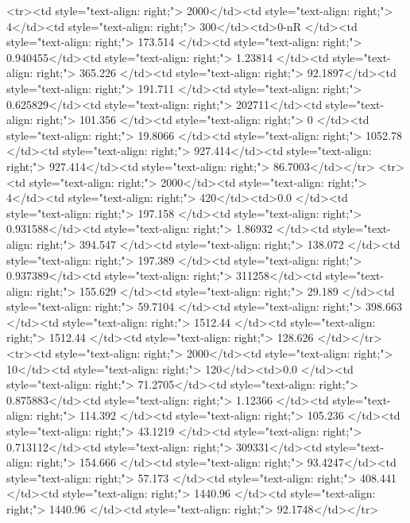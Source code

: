 <tr><td style="text-align: right;">      2000</td><td style="text-align: right;">         4</td><td style="text-align: right;">           300</td><td>0-nR         </td><td style="text-align: right;">               173.514 </td><td style="text-align: right;">           0.940455</td><td style="text-align: right;">         1.23814 </td><td style="text-align: right;">        365.226 </td><td style="text-align: right;">            92.1897</td><td style="text-align: right;">             191.711   </td><td style="text-align: right;">             0.625829</td><td style="text-align: right;">              202711</td><td style="text-align: right;">                      101.356 </td><td style="text-align: right;">             0     </td><td style="text-align: right;">                19.8066 </td><td style="text-align: right;">      1052.78  </td><td style="text-align: right;">    927.414</td><td style="text-align: right;">       927.414</td><td style="text-align: right;">                 86.7003</td></tr>
<tr><td style="text-align: right;">      2000</td><td style="text-align: right;">         4</td><td style="text-align: right;">           420</td><td>0.0          </td><td style="text-align: right;">               197.158 </td><td style="text-align: right;">           0.931588</td><td style="text-align: right;">         1.86932 </td><td style="text-align: right;">        394.547 </td><td style="text-align: right;">           138.072 </td><td style="text-align: right;">             197.389   </td><td style="text-align: right;">             0.937389</td><td style="text-align: right;">              311258</td><td style="text-align: right;">                      155.629 </td><td style="text-align: right;">            29.189 </td><td style="text-align: right;">                59.7104 </td><td style="text-align: right;">       398.663 </td><td style="text-align: right;">   1512.44 </td><td style="text-align: right;">      1512.44 </td><td style="text-align: right;">                128.626 </td></tr>
<tr><td style="text-align: right;">      2000</td><td style="text-align: right;">        10</td><td style="text-align: right;">           120</td><td>0.0          </td><td style="text-align: right;">                71.2705</td><td style="text-align: right;">           0.875883</td><td style="text-align: right;">         1.12366 </td><td style="text-align: right;">        114.392 </td><td style="text-align: right;">           105.236 </td><td style="text-align: right;">              43.1219  </td><td style="text-align: right;">             0.713112</td><td style="text-align: right;">              309331</td><td style="text-align: right;">                      154.666 </td><td style="text-align: right;">            93.4247</td><td style="text-align: right;">                57.173  </td><td style="text-align: right;">       408.441 </td><td style="text-align: right;">   1440.96 </td><td style="text-align: right;">      1440.96 </td><td style="text-align: right;">                 92.1748</td></tr>
